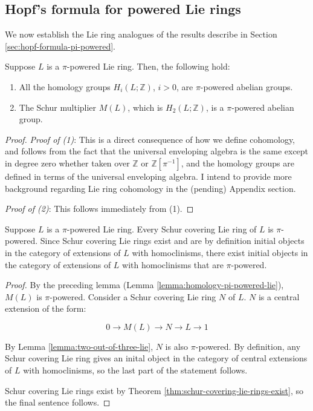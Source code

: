 \documentclass{ucetd}
\begin{document}
\subsection{Hopf's formula for powered Lie rings}\label{sec:hopf-formula-pi-powered-lie}

We now establish the Lie ring analogues of the results describe in
Section \ref{sec:hopf-formula-pi-powered}.

\begin{lemma}\label{lemma:homology-pi-powered-lie}
  Suppose $L$ is a $\pi$-powered Lie ring. Then, the following hold:

  \begin{enumerate}
    \item All the homology groups $H_i(L;\mathbb{Z})$, $i > 0$, are
      $\pi$-powered abelian groups.
    \item The Schur multiplier $M(L)$, which is $H_2(L;\mathbb{Z})$, is
      a $\pi$-powered abelian group.
\end{enumerate}
\end{lemma}

\begin{proof}
  {\em Proof of (1)}: This is a direct consequence of how we define
  cohomology, and follows from the fact that the universal enveloping
  algebra is the same except in degree zero whether taken over
  $\mathbb{Z}$ or $\mathbb{Z}[\pi^{-1}]$, and the homology groups are
  defined in terms of the universal enveloping algebra. I intend to
  provide more background regarding Lie ring cohomology in the
  (pending) Appendix section.

  {\em Proof of (2)}: This follows immediately from (1).
\end{proof}

\begin{lemma}\label{lemma:schur-cover-pi-powered-lie}
  Suppose $L$ is a $\pi$-powered  Lie ring. Every Schur covering
  Lie ring of $L$ is $\pi$-powered. Since Schur covering Lie rings exist and
  are by definition initial objects in the category of extensions of
  $L$ with homoclinisms, there exist initial objects in the category
  of extensions of $L$ with homoclinisms that are $\pi$-powered.
\end{lemma}

\begin{proof}
  By the preceding lemma (Lemma \ref{lemma:homology-pi-powered-lie}),
  $M(L)$ is $\pi$-powered. Consider a Schur covering Lie ring $N$ of
  $L$. $N$ is a central extension of the form:

  $$0 \to M(L) \to N \to L \to 1$$

  By Lemma \ref{lemma:two-out-of-three-lie}, $N$ is also
  $\pi$-powered. By definition, any Schur covering Lie ring gives an
  inital object in the category of central extensions of $L$ with
  homoclinisms, so the last part of the statement follows.

  Schur covering Lie rings exist by Theorem
  \ref{thm:schur-covering-lie-rings-exist}, so the final sentence
  follows.
\end{proof}
\end{document}
